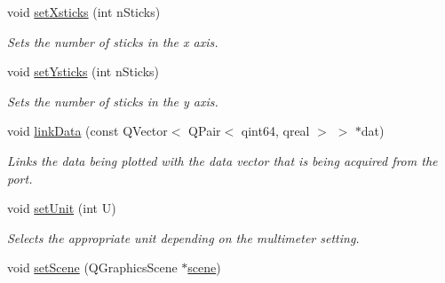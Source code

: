 \begin{DoxyCompactItemize}
void \hyperlink{classplot_graph_ab78b439ee76e1f4df9a9e26ebcd3bc29}{set\-Xsticks} (int n\-Sticks)
\begin{DoxyCompactList}\small\item\em Sets the number of sticks in the x axis. \end{DoxyCompactList}\item 
void \hyperlink{classplot_graph_af5944ac87c177035eeeaf61d64b1a139}{set\-Ysticks} (int n\-Sticks)
\begin{DoxyCompactList}\small\item\em Sets the number of sticks in the y axis. \end{DoxyCompactList}\item 
void \hyperlink{classplot_graph_a8eb89c53d633e0a9574f1670c9c0d644}{link\-Data} (const Q\-Vector$<$ Q\-Pair$<$ qint64, qreal $>$ $>$ $\ast$dat)
\begin{DoxyCompactList}\small\item\em Links the data being plotted with the data vector that is being acquired from the port. \end{DoxyCompactList}\item 
void \hyperlink{classplot_graph_a09a7563bcd8a387e1d9bf3f534ecd990}{set\-Unit} (int U)
\begin{DoxyCompactList}\small\item\em Selects the appropriate unit depending on the multimeter setting. \end{DoxyCompactList}\item 
void \hyperlink{classplot_graph_ace55db051cab85e9a0c20795f4c2349a}{set\-Scene} (Q\-Graphics\-Scene $\ast$\hyperlink{classplot_graph_ac35eabe1a0ffbb4379fedebe6d5057c3}{scene})
\end{DoxyCompactItemize}
